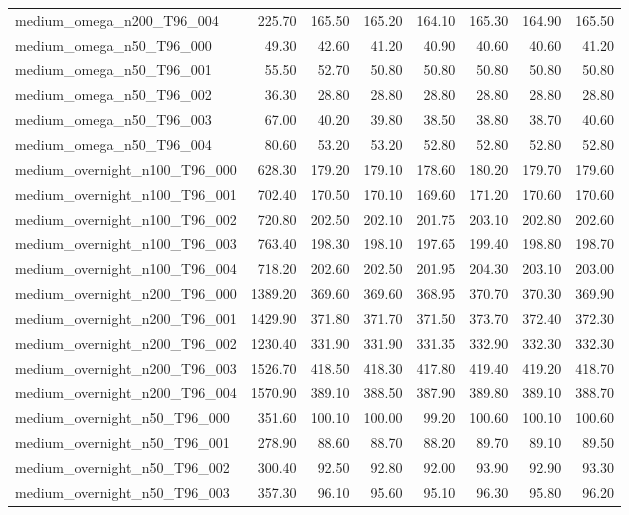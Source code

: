 \begin{table}[htbp]
\begin{tabular}{lrrrrrrr}
medium\_omega\_n200\_T96\_004 & 225.70 & 165.50 & 165.20 & 164.10 & 165.30 & 164.90 & 165.50 \\
medium\_omega\_n50\_T96\_000 & 49.30 & 42.60 & 41.20 & 40.90 & 40.60 & 40.60 & 41.20 \\
medium\_omega\_n50\_T96\_001 & 55.50 & 52.70 & 50.80 & 50.80 & 50.80 & 50.80 & 50.80 \\
medium\_omega\_n50\_T96\_002 & 36.30 & 28.80 & 28.80 & 28.80 & 28.80 & 28.80 & 28.80 \\
medium\_omega\_n50\_T96\_003 & 67.00 & 40.20 & 39.80 & 38.50 & 38.80 & 38.70 & 40.60 \\
medium\_omega\_n50\_T96\_004 & 80.60 & 53.20 & 53.20 & 52.80 & 52.80 & 52.80 & 52.80 \\
medium\_overnight\_n100\_T96\_000 & 628.30 & 179.20 & 179.10 & 178.60 & 180.20 & 179.70 & 179.60 \\
medium\_overnight\_n100\_T96\_001 & 702.40 & 170.50 & 170.10 & 169.60 & 171.20 & 170.60 & 170.60 \\
medium\_overnight\_n100\_T96\_002 & 720.80 & 202.50 & 202.10 & 201.75 & 203.10 & 202.80 & 202.60 \\
medium\_overnight\_n100\_T96\_003 & 763.40 & 198.30 & 198.10 & 197.65 & 199.40 & 198.80 & 198.70 \\
medium\_overnight\_n100\_T96\_004 & 718.20 & 202.60 & 202.50 & 201.95 & 204.30 & 203.10 & 203.00 \\
medium\_overnight\_n200\_T96\_000 & 1389.20 & 369.60 & 369.60 & 368.95 & 370.70 & 370.30 & 369.90 \\
medium\_overnight\_n200\_T96\_001 & 1429.90 & 371.80 & 371.70 & 371.50 & 373.70 & 372.40 & 372.30 \\
medium\_overnight\_n200\_T96\_002 & 1230.40 & 331.90 & 331.90 & 331.35 & 332.90 & 332.30 & 332.30 \\
medium\_overnight\_n200\_T96\_003 & 1526.70 & 418.50 & 418.30 & 417.80 & 419.40 & 419.20 & 418.70 \\
medium\_overnight\_n200\_T96\_004 & 1570.90 & 389.10 & 388.50 & 387.90 & 389.80 & 389.10 & 388.70 \\
medium\_overnight\_n50\_T96\_000 & 351.60 & 100.10 & 100.00 & 99.20 & 100.60 & 100.10 & 100.60 \\
medium\_overnight\_n50\_T96\_001 & 278.90 & 88.60 & 88.70 & 88.20 & 89.70 & 89.10 & 89.50 \\
medium\_overnight\_n50\_T96\_002 & 300.40 & 92.50 & 92.80 & 92.00 & 93.90 & 92.90 & 93.30 \\
medium\_overnight\_n50\_T96\_003 & 357.30 & 96.10 & 95.60 & 95.10 & 96.30 & 95.80 & 96.20 \\

\end{tabular}
\end{table}
